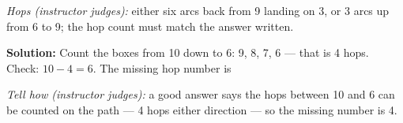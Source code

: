 \documentclass[12pt]{article}
\begin{document}
\emph{Hops (instructor judges):} either six arcs back from 9 landing on 3,
or 3 arcs up from 6 to 9; the hop count must match the answer written.


\textbf{Solution:} Count the boxes from 10 down to 6: 9, 8, 7, 6 --- that is
4 hops. Check: $10-4=6$. The missing hop number is 

\emph{Tell how (instructor judges):} a good answer says the hops between 10
and 6 can be counted on the path --- 4 hops either direction --- so the
missing number is 4.
\end{document}
